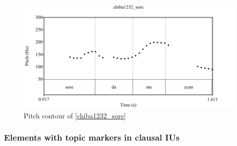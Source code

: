 \begin{figure}
	\begin{center}
	\includegraphics[width=.95\textwidth]{sounds/chiba1232_sore.pdf}
	\caption{Pitch contour of \ref{chiba1232_sore}}
	\label{chiba1232_soreF}
	\end{center}
\end{figure}




\subsubsection{Elements with topic markers in clausal IUs}\label{TopCIU}

